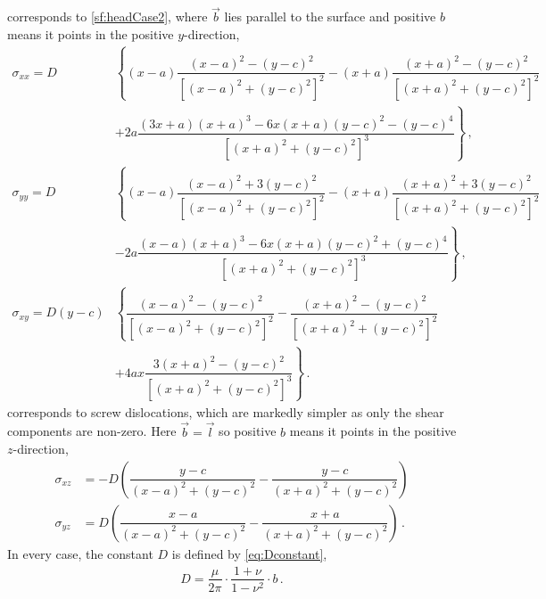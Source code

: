  corresponds to \cref{sf:headCase2}, where $\vec{b}$ lies parallel to the surface and positive $b$ means it points in the positive $y$-direction,
\begin{subequations}\label{eq:imageStressAnalyticEdge2}
  \begin{align}
    \sigma_{xx} = D         & \left\{ (x - a) \dfrac{(x - a)^2 - (y - c)^2}{[(x - a)^2 + (y - c)^2]^2} -(x + a) \dfrac{(x + a)^2 - (y - c)^2}{[(x + a)^2 + (y - c)^2]^2} \right.     \\\nonumber
                            & \left. + 2 a \dfrac{(3 x + a) (x + a)^3 - 6 x (x + a) (y - c)^2 - (y - c)^4}{[(x + a)^2 + (y - c)^2]^3}\right\}\,,                                     \\
    \sigma_{yy} = D         & \left\{ (x - a) \dfrac{(x - a)^2 + 3 (y - c)^2}{[(x - a)^2 + (y - c)^2]^2} - (x + a) \dfrac{(x + a)^2 + 3 (y - c)^2}{[(x + a)^2 + (y - c)^2]^2}\right. \\\nonumber
                            & \left. - 2 a \dfrac{(x - a) (x + a)^3 - 6 x (x + a) (y - c)^2 + (y - c)^4}{[(x + a)^2 + (y - c)^2]^3}\right\}\,,                                       \\
    \sigma_{xy} = D (y - c) & \left\{\dfrac{(x - a)^2 - (y - c)^2}{[(x - a)^2 + (y - c)^2]^2} - \dfrac{(x + a)^2 - (y - c)^2}{[(x + a)^2 + (y - c)^2]^2} \right.                     \\\nonumber
                            & \left. + 4 a x \dfrac{3 (x + a)^2 - (y - c)^2}{[(x + a)^2 + (y - c)^2]^3}\right\}\,.
  \end{align}
\end{subequations}
 corresponds to screw dislocations, which are markedly simpler as only the shear components are non-zero. Here $\vec{b} = \vec{l}$ so positive $b$ means it points in the positive $z$-direction,
\begin{subequations}\label{eq:imageStressAnalyticScrew}
  \begin{align}
    \sigma_{xz} & = -D \left(\dfrac{y - c}{(x - a)^2 + (y - c)^2} - \dfrac{y - c}{(x + a)^2 + (y - c)^2}\right)   \\
    \sigma_{yz} & = D \left(\dfrac{x - a}{(x - a)^2 + (y - c)^2} - \dfrac{x + a}{(x + a)^2 + (y - c)^2}\right)\,.
  \end{align}
\end{subequations}
In every case, the constant $D$ is defined by \cref{eq:Dconstant},
\begin{align}\label{eq:Dconstant}
  D = \dfrac{\mu}{2\pi} \cdot \dfrac{1+\nu}{1-\nu^2} \cdot b\,.
\end{align}
